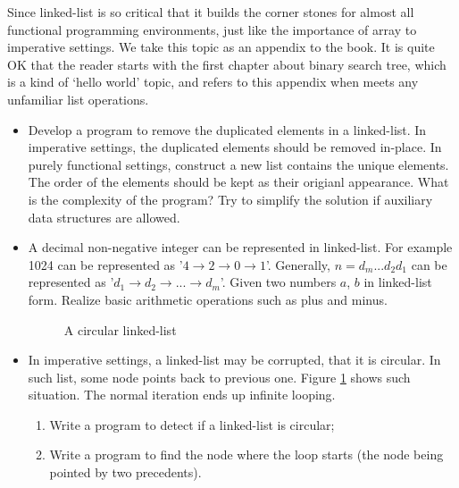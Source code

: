 \documentclass[b5paper]{article}
\begin{document}
Since linked-list is so critical that it builds the corner stones for almost all functional programming
environments, just like the importance of array to imperative settings. We take this topic as an appendix
to the book. It is quite OK that the reader starts with the first chapter about binary search tree, which
is a kind of `hello world' topic, and refers to this appendix when meets any unfamiliar list operations.

\begin{Exercise}
\begin{itemize}
\item Develop a program to remove the duplicated elements in a linked-list.
In imperative settings, the duplicated elements should be removed in-place. In purely functional
settings, construct a new list contains the unique elements. The order of the elements
should be kept as their origianl appearance. What is the complexity of the
program? Try to simplify the solution if auxiliary data structures are allowed.
\item A decimal non-negative integer can be represented in linked-list. For example 1024 can be represented as
'$4 \rightarrow 2 \rightarrow 0 \rightarrow 1$'. Generally, $n = d_m...d_2d_1$ can be represented as
'$d_1 \rightarrow d_2 \rightarrow ... \rightarrow d_m$'. Given two numbers $a$, $b$ in linked-list form.
Realize basic arithmetic operations such as plus and minus.
\begin{figure}[htbp]
\centering
{}
\caption{A circular linked-list}
\label{fig:circular-list}
\end{figure}

\item In imperative settings, a linked-list may be corrupted, that it is circular. In such list, some node
points back to previous one. Figure \ref{fig:circular-list} shows such situation.
The normal iteration ends up infinite looping.
  \begin{enumerate}
    \item Write a program to detect if a linked-list is circular;
    \item Write a program to find the node where the loop starts (the node being pointed by two precedents).
  \end{enumerate}

\end{itemize}

\end{Exercise}
\end{document}
